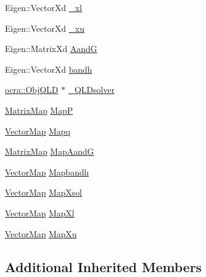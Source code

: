 \begin{DoxyCompactItemize}
\item 
Eigen\+::\+Vector\+Xd \hyperlink{classocra_1_1OneLevelSolverWithQLD_add5b646798e6e18dd3baa6153e42ed3a}{\+\_\+xl}
\item 
Eigen\+::\+Vector\+Xd \hyperlink{classocra_1_1OneLevelSolverWithQLD_af2f22245e4805d0206f70171503501b5}{\+\_\+xu}
\item 
Eigen\+::\+Matrix\+Xd \hyperlink{classocra_1_1OneLevelSolverWithQLD_aabe1df1e34e0e44246736da42822c51c}{AandG}
\item 
Eigen\+::\+Vector\+Xd \hyperlink{classocra_1_1OneLevelSolverWithQLD_a5f85407cde010aa3c41dbc80f3dd254e}{bandh}
\item 
\hyperlink{classocra_1_1ObjQLD}{ocra\+::\+Obj\+Q\+LD} $\ast$ \hyperlink{classocra_1_1OneLevelSolverWithQLD_aa7fbbc63b0e6654166aedee4c067af26}{\+\_\+\+Q\+L\+Dsolver}
\item 
\hyperlink{group__solver_ga2890a4739c18700eeea0645d1e41b5f7}{Matrix\+Map} \hyperlink{classocra_1_1OneLevelSolverWithQLD_abf57e1d9653bf9c6a0c69ba9049fdfaa}{MapP}
\item 
\hyperlink{group__solver_ga48f83fdb8879c800a49682c6f9c3f2e5}{Vector\+Map} \hyperlink{classocra_1_1OneLevelSolverWithQLD_a46b6cd8f4d8cd28cf60ba99231ab182d}{Mapq}
\item 
\hyperlink{group__solver_ga2890a4739c18700eeea0645d1e41b5f7}{Matrix\+Map} \hyperlink{classocra_1_1OneLevelSolverWithQLD_a67c9e0cc8efc507c4e5f0cf216cf5073}{Map\+AandG}
\item 
\hyperlink{group__solver_ga48f83fdb8879c800a49682c6f9c3f2e5}{Vector\+Map} \hyperlink{classocra_1_1OneLevelSolverWithQLD_aedba3797f1f7d4e36a4d5ecf147472a0}{Mapbandh}
\item 
\hyperlink{group__solver_ga48f83fdb8879c800a49682c6f9c3f2e5}{Vector\+Map} \hyperlink{classocra_1_1OneLevelSolverWithQLD_a98bcee40691dd4f96240148c11170fa0}{Map\+Xsol}
\item 
\hyperlink{group__solver_ga48f83fdb8879c800a49682c6f9c3f2e5}{Vector\+Map} \hyperlink{classocra_1_1OneLevelSolverWithQLD_aad35b068cc43424c11d03acc3fa50efb}{Map\+Xl}
\item 
\hyperlink{group__solver_ga48f83fdb8879c800a49682c6f9c3f2e5}{Vector\+Map} \hyperlink{classocra_1_1OneLevelSolverWithQLD_ae775b8d75c6c825a0f689aafc6316b3b}{Map\+Xu}
\end{DoxyCompactItemize}
\subsection*{Additional Inherited Members}


